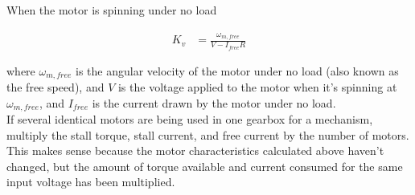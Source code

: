 \noindent When the motor is spinning under no load

\begin{align}
  K_v &= \frac{\omega_{m,free}}{V - I_{free}R}
\end{align}

\noindent where $\omega_{m,free}$ is the angular velocity of the motor under no
load (also known as the free speed), and $V$ is the voltage applied to the motor
when it's spinning at $\omega_{m,free}$, and $I_{free}$ is the current drawn by
the motor under no load. \\

If several identical motors are being used in one gearbox for a mechanism,
multiply the stall torque, stall current, and free current by the number of
motors. This makes sense because the motor characteristics calculated above
haven't changed, but the amount of torque available and current consumed for the
same input voltage has been multiplied.
